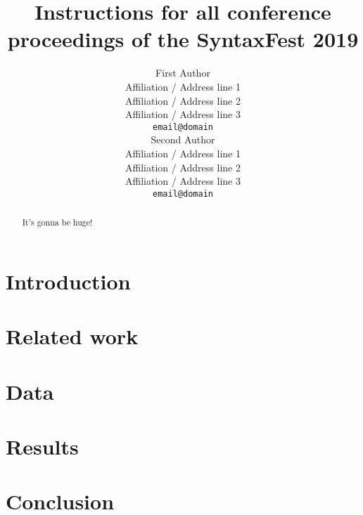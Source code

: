 \documentclass[11pt]{article}
\title{Instructions for all conference proceedings of the SyntaxFest 2019}
\author{First Author \\
  Affiliation / Address line 1 \\
  Affiliation / Address line 2 \\
  Affiliation / Address line 3 \\
  {\tt email@domain} \\\And
  Second Author \\
  Affiliation / Address line 1 \\
  Affiliation / Address line 2 \\
  Affiliation / Address line 3 \\
  {\tt email@domain} \\}
\date{}
\begin{document}
\maketitle
\begin{abstract}
It's gonna be huge!
\end{abstract}


\section{Introduction}
\label{intro}

\section{Related work}

\section{Data}

\section{Results}

\section{Conclusion}

% 
% 
\end{document}
